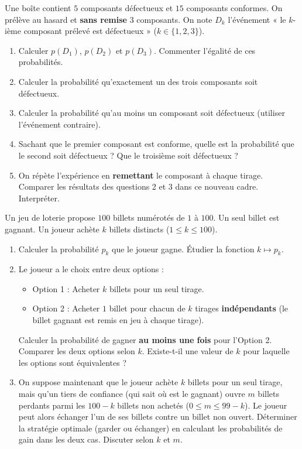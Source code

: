 \documentclass[11pt]{article}
\begin{document}
\begin{exercice}
Une boîte contient $5$ composants défectueux et $15$ composants conformes. On prélève au hasard et \textbf{sans remise} $3$ composants. On note $D_k$ l'événement « le $k$-ième composant prélevé est défectueux » ($k \in \{1,2,3\}$).
\begin{enumerate}
    \item Calculer $p(D_1)$, $p(D_2)$ et $p(D_3)$. Commenter l'égalité de ces probabilités.
    \item Calculer la probabilité qu'exactement un des trois composants soit défectueux.
    \item Calculer la probabilité qu'au moins un composant soit défectueux (utiliser l'événement contraire).
    \item Sachant que le premier composant est conforme, quelle est la probabilité que le second soit défectueux ? Que le troisième soit défectueux ?
    \item On répète l'expérience en \textbf{remettant} le composant à chaque tirage. Comparer les résultats des questions 2 et 3 dans ce nouveau cadre. Interpréter.
\end{enumerate}
\end{exercice}

\begin{exercice}
Un jeu de loterie propose $100$ billets numérotés de $1$ à $100$. Un seul billet est gagnant. Un joueur achète $k$ billets distincts ($1 \le k \le 100$).
\begin{enumerate}
    \item Calculer la probabilité $p_k$ que le joueur gagne. Étudier la fonction $k \mapsto p_k$.
    \item Le joueur a le choix entre deux options :
    \begin{itemize}
        \item Option 1 : Acheter $k$ billets pour un seul tirage.
        \item Option 2 : Acheter $1$ billet pour chacun de $k$ tirages \textbf{indépendants} (le billet gagnant est remis en jeu à chaque tirage).
    \end{itemize}
    Calculer la probabilité de gagner \textbf{au moins une fois} pour l'Option 2. Comparer les deux options selon $k$. Existe-t-il une valeur de $k$ pour laquelle les options sont équivalentes ?
    \item On suppose maintenant que le joueur achète $k$ billets pour un seul tirage, mais qu'un tiers de confiance (qui sait où est le gagnant) ouvre $m$ billets perdants parmi les $100-k$ billets non achetés ($0 \le m \le 99-k$). Le joueur peut alors échanger l'un de ses billets contre un billet non ouvert. Déterminer la stratégie optimale (garder ou échanger) en calculant les probabilités de gain dans les deux cas. Discuter selon $k$ et $m$.
\end{enumerate}
\end{exercice}
\end{document}
